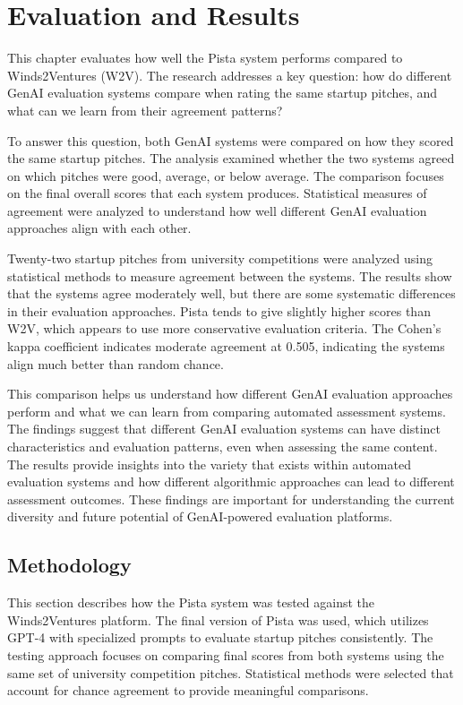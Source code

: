 \chapter{Evaluation and Results}
\label{ch:evaluation}

This chapter evaluates how well the Pista system performs compared to Winds2Ventures (W2V). The research addresses a key question: how do different GenAI evaluation systems compare when rating the same startup pitches, and what can we learn from their agreement patterns?

To answer this question, both GenAI systems were compared on how they scored the same startup pitches. The analysis examined whether the two systems agreed on which pitches were good, average, or below average. The comparison focuses on the final overall scores that each system produces. Statistical measures of agreement were analyzed to understand how well different GenAI evaluation approaches align with each other.

Twenty-two startup pitches from university competitions were analyzed using statistical methods to measure agreement between the systems. The results show that the systems agree moderately well, but there are some systematic differences in their evaluation approaches. Pista tends to give slightly higher scores than W2V, which appears to use more conservative evaluation criteria. The Cohen's kappa coefficient indicates moderate agreement at 0.505, indicating the systems align much better than random chance.

This comparison helps us understand how different GenAI evaluation approaches perform and what we can learn from comparing automated assessment systems. The findings suggest that different GenAI evaluation systems can have distinct characteristics and evaluation patterns, even when assessing the same content. The results provide insights into the variety that exists within automated evaluation systems and how different algorithmic approaches can lead to different assessment outcomes. These findings are important for understanding the current diversity and future potential of GenAI-powered evaluation platforms.

\section{Methodology}
\label{sec:methodology}

This section describes how the Pista system was tested against the Winds2Ventures platform. The final version of Pista was used, which utilizes GPT-4 with specialized prompts to evaluate startup pitches consistently. The testing approach focuses on comparing final scores from both systems using the same set of university competition pitches. Statistical methods were selected that account for chance agreement to provide meaningful comparisons.

